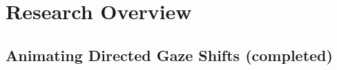 


\pagestyle{deposit}

\chapter{Research Overview}


\section{Animating Directed Gaze Shifts (completed)}
\label{sec:GazeShifts}

